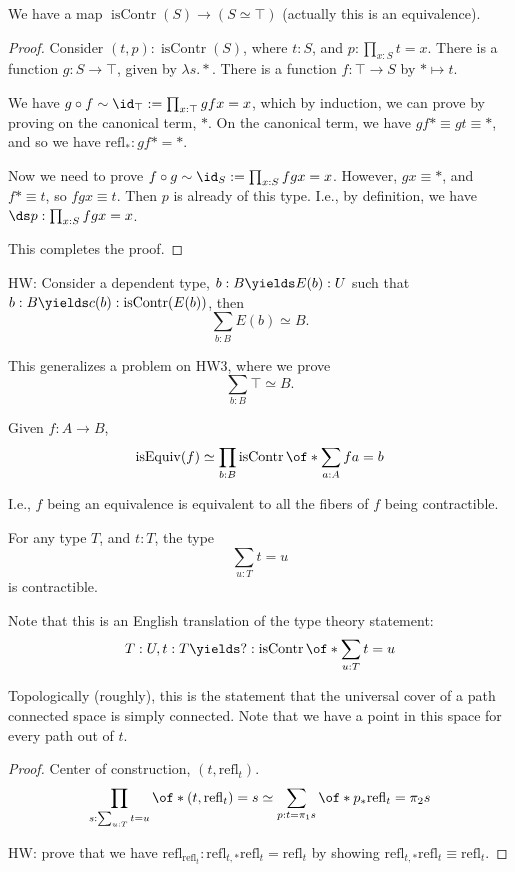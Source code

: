 \documentclass{article}
\newcommand\pred[1]{\operatorname{#1}}
\newcommand\isEquiv{\pred{isEquiv}}
\newcommand\refl{\mathrm{refl}}
\newcommand\isContr{\pred{isContr}}
\begin{document}
\begin{proposition}
    We have a map $\isContr(S)\to (S\simeq \top)$ (actually this 
    is an equivalence).
\end{proposition}

\begin{proof}
    Consider 
    $(t,p):\isContr(S)$, where $t:S$, and $p:\prod_{x:S} t=x$.
    There is a function $g:S\to \top$, given by 
    $\lambda s. *$. There is a function $f:\top\to S$ by 
    $*\mapsto t$.

    We have $g\circ f \sim \id_\top := \prod_{x:\top} gfx = x$,
    which by induction,
    we can prove by proving on the canonical term, $*$.
    On the canonical term, we have $gf* \equiv gt \equiv *$,
    and so we have $\refl_* : gf* = *$.

    Now we need to prove 
    $f\circ g \sim \id_S := \prod_{x:S} fgx = x$.
    However, $gx \equiv *$, and $f* \equiv t$, so $fgx \equiv t$.
    Then $p$ is already of this type. I.e., 
    by definition, we have $\ds p:\prod_{x:S} fgx = x$.

    This completes the proof.
\end{proof}

HW: Consider a dependent type, $b:B\yields E(b) : U$ such that
$b:B\yields c(b):\isContr(E(b))$, then 
\[\sum_{b:B}E(b) \simeq B. \]

This generalizes a problem on HW3, where we prove
\[\sum_{b:B} \top \simeq B.\]

\begin{proposition}
    Given $f:A\to B$,
    \[\isEquiv(f) \simeq 
    \prod_{b:B} \isContr\of*{
        \sum_{a:A} fa = b
    }
    \]

    I.e., $f$ being an equivalence is equivalent 
    to all the fibers of $f$ being contractible.
\end{proposition}

\begin{proposition}
    For any type $T$, and $t:T$, the type 
    \[
        \sum_{u:T} t=u
    \]
    is contractible.

    Note that this is an English translation of the type theory 
    statement:
    \[
        T:U,t:T\yields ?:\isContr\of*{
            \sum_{u:T} t=u
        }
    \]

    Topologically (roughly), this is the statement that the 
    universal cover of a path connected space is simply connected.
    Note that we have a point in this space for every path out 
    of $t$.
\end{proposition}

\begin{proof}
    Center of construction,
    $(t,\refl_t)$.
    \[\prod_{s:\sum_{u:T}t=u} \of*{
        (t,\refl_t) = s
    }
    \simeq
    \sum_{p:t=\pi_1s}
    \of*{
        p_*\refl_t = \pi_2s
    }
    \]
    
    HW: prove that we have 
    $\refl_{\refl_t}: \refl_{t,*}\refl_t = \refl_t$
    by showing $\refl_{t,*}\refl_t \equiv \refl_t$.
\end{proof}
    
\end{document}
